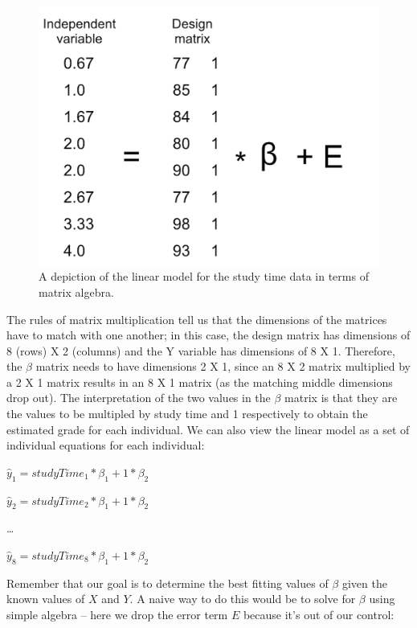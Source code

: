 \documentclass[12pt,]{book}
\theoremstyle{definition}
\theoremstyle{definition}
\theoremstyle{definition}
\theoremstyle{remark}
\begin{document}
\begin{figure}
\includegraphics[width=16.67in]{images/glm_matrix} \caption{A depiction of the linear model for the study time data in terms of matrix algebra.}\label{fig:GLMmatrix}
\end{figure}

The rules of matrix multiplication tell us that the dimensions of the matrices have to match with one another; in this case, the design matrix has dimensions of 8 (rows) X 2 (columns) and the Y variable has dimensions of 8 X 1. Therefore, the \(\beta\) matrix needs to have dimensions 2 X 1, since an 8 X 2 matrix multiplied by a 2 X 1 matrix results in an 8 X 1 matrix (as the matching middle dimensions drop out). The interpretation of the two values in the \(\beta\) matrix is that they are the values to be multipled by study time and 1 respectively to obtain the estimated grade for each individual. We can also view the linear model as a set of individual equations for each individual:

\(\hat{y}_1 = studyTime_1*\beta_1 + 1*\beta_2\)

\(\hat{y}_2 = studyTime_2*\beta_1 + 1*\beta_2\)

\ldots{}

\(\hat{y}_8 = studyTime_8*\beta_1 + 1*\beta_2\)

Remember that our goal is to determine the best fitting values of \(\beta\) given the known values of \(X\) and \(Y\). A naive way to do this would be to solve for \(\beta\) using simple algebra -- here we drop the error term \(E\) because it's out of our control:
\end{document}
